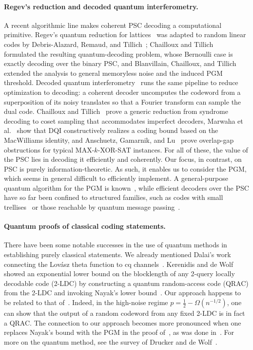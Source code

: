 \documentclass[11pt]{article}
\theoremstyle{remark}
\begin{document}
\paragraph{Regev's reduction and decoded quantum interferometry.} A recent algorithmic line makes coherent PSC decoding a computational primitive. Regev's quantum reduction for lattices~\cite{Reg09} was adapted to random linear codes by Debris-Alazard, Remaud, and Tillich~\cite{DART24}; Chailloux and Tillich~\cite{CT24} formulated the resulting quantum-decoding problem, whose Bernoulli case is exactly decoding over the binary PSC, and Blanvillain, Chailloux, and Tillich~\cite{BCT26} extended the analysis to general memoryless noise and the induced PGM threshold. Decoded quantum interferometry~\cite{JSWZSKIKB25} runs the same pipeline to reduce optimization to decoding: a coherent decoder uncomputes the codeword from a superposition of its noisy translates so that a Fourier transform can sample the dual code. Chailloux and Tillich~\cite{CT25} prove a generic reduction from syndrome decoding to coset sampling that accommodates imperfect decoders, Marwaha et al.~\cite{MFGH25} show that DQI constructively realizes a coding bound based on the MacWilliams identity, and Anschuetz, Gamarnik, and Lu~\cite{AGL25} prove overlap-gap obstructions for typical MAX-$k$-XOR-SAT instances. For all of these, the value of the PSC lies in decoding it efficiently and coherently. Our focus, in contrast, on PSC is purely information-theoretic. As such, it enables us to consider the PGM, which seems in general difficult to efficiently implement. A general-purpose quantum algorithm for the PGM is known~\cite{GLMQW22}, while efficient decoders over the PSC have so far been confined to structured families, such as codes with small trellises~\cite{PR25} or those reachable by quantum message passing~\cite{Ren17,MP26}.

\paragraph{Quantum proofs of classical coding statements.} There have been some notable successes in the use of quantum methods in establishing purely classical statements. We already mentioned Dalai's work connecting the Lov\'{a}sz theta function to cq channels~\cite{Dal13}. Kerenidis and de Wolf~\cite{KdW04} showed an exponential lower bound on the blocklength of any 2-query locally decodable code (2-LDC) by constructing a quantum random-access code (QRAC) from the 2-LDC and invoking Nayak's lower bound~\cite{Nay99}. Our approach happens to be related to that of~\cite{KdW04}. Indeed, in the high-noise regime $p = \frac{1}{2} - \Omega(n^{-1/2})$, one can show that the output of a random codeword from any fixed 2-LDC is in fact a QRAC. The connection to our approach becomes more pronounced when one replaces Nayak's bound with the PGM in the proof of~\cite{KdW04}, as was done in~\cite{LdW25}. For more on the quantum method, see the survey of Drucker and de Wolf~\cite{DdW11}.
\end{document}
